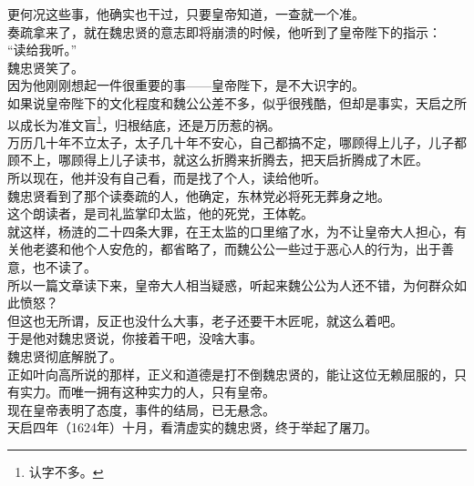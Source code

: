 \begin{multicols}{\theparacolNo}
更何况这些事，他确实也干过，只要皇帝知道，一查就一个准。\\

奏疏拿来了，就在魏忠贤的意志即将崩溃的时候，他听到了皇帝陛下的指示：\\

“读给我听。”\\

魏忠贤笑了。\\

因为他刚刚想起一件很重要的事——皇帝陛下，是不大识字的。\\

如果说皇帝陛下的文化程度和魏公公差不多，似乎很残酷，但却是事实，天启之所以成长为准文盲\footnote{认字不多。}，归根结底，还是万历惹的祸。\\

万历几十年不立太子，太子几十年不安心，自己都搞不定，哪顾得上儿子，儿子都顾不上，哪顾得上儿子读书，就这么折腾来折腾去，把天启折腾成了木匠。\\

所以现在，他并没有自己看，而是找了个人，读给他听。\\

魏忠贤看到了那个读奏疏的人，他确定，东林党必将死无葬身之地。\\

这个朗读者，是司礼监掌印太监，他的死党，王体乾。\\

就这样，杨涟的二十四条大罪，在王太监的口里缩了水，为不让皇帝大人担心，有关他老婆和他个人安危的，都省略了，而魏公公一些过于恶心人的行为，出于善意，也不读了。\\

所以一篇文章读下来，皇帝大人相当疑惑，听起来魏公公为人还不错，为何群众如此愤怒？\\

但这也无所谓，反正也没什么大事，老子还要干木匠呢，就这么着吧。\\

于是他对魏忠贤说，你接着干吧，没啥大事。\\

魏忠贤彻底解脱了。\\

正如叶向高所说的那样，正义和道德是打不倒魏忠贤的，能让这位无赖屈服的，只有实力。而唯一拥有这种实力的人，只有皇帝。\\

现在皇帝表明了态度，事件的结局，已无悬念。\\

天启四年（1624年）十月，看清虚实的魏忠贤，终于举起了屠刀。\\


\end{multicols}
